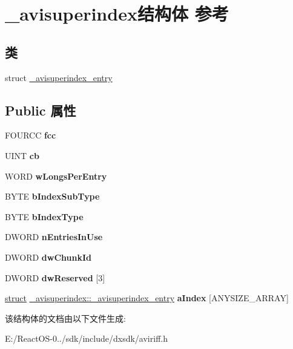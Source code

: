 \hypertarget{struct__avisuperindex}{}\section{\+\_\+avisuperindex结构体 参考}
\label{struct__avisuperindex}
\subsection*{类}
\begin{DoxyCompactItemize}
\item 
struct \hyperlink{struct__avisuperindex_1_1__avisuperindex__entry}{\+\_\+avisuperindex\+\_\+entry}
\end{DoxyCompactItemize}
\subsection*{Public 属性}
\begin{DoxyCompactItemize}
\item 
\mbox{\label{struct__avisuperindex_af197221076a908690f324d283461e9aa}} 
F\+O\+U\+R\+CC {\bfseries fcc}
\item 
\mbox{\label{struct__avisuperindex_a14e39ae6a42bc047427b6c3ceabe7d94}} 
U\+I\+NT {\bfseries cb}
\item 
\mbox{\label{struct__avisuperindex_a44978ca0b5ac902f9d8d05253b9771c9}} 
W\+O\+RD {\bfseries w\+Longs\+Per\+Entry}
\item 
\mbox{\label{struct__avisuperindex_a267b4b5b1e1a686f0a4f0b089de4e3b9}} 
B\+Y\+TE {\bfseries b\+Index\+Sub\+Type}
\item 
\mbox{\label{struct__avisuperindex_adeb45fa7fe7c3ea70ea5cda8b0283919}} 
B\+Y\+TE {\bfseries b\+Index\+Type}
\item 
\mbox{\label{struct__avisuperindex_aaab780a2d6d411ac3ed05ef33027fffa}} 
D\+W\+O\+RD {\bfseries n\+Entries\+In\+Use}
\item 
\mbox{\label{struct__avisuperindex_af0986b5cffb9c4cfcafff805cfd3a8b3}} 
D\+W\+O\+RD {\bfseries dw\+Chunk\+Id}
\item 
\mbox{\label{struct__avisuperindex_a2c8672e401b3ef2cc420d213e80486f4}} 
D\+W\+O\+RD {\bfseries dw\+Reserved} \mbox{[}3\mbox{]}
\item 
\mbox{\label{struct__avisuperindex_afa79fee81bad484da1c6723af7adaaa4}} 
\hyperlink{interfacestruct}{struct} \hyperlink{struct__avisuperindex_1_1__avisuperindex__entry}{\+\_\+avisuperindex\+::\+\_\+avisuperindex\+\_\+entry} {\bfseries a\+Index} \mbox{[}A\+N\+Y\+S\+I\+Z\+E\+\_\+\+A\+R\+R\+AY\mbox{]}
\end{DoxyCompactItemize}


该结构体的文档由以下文件生成\+:\begin{DoxyCompactItemize}
\item 
E\+:/\+React\+O\+S-\/0../sdk/include/dxsdk/aviriff.\+h\end{DoxyCompactItemize}
